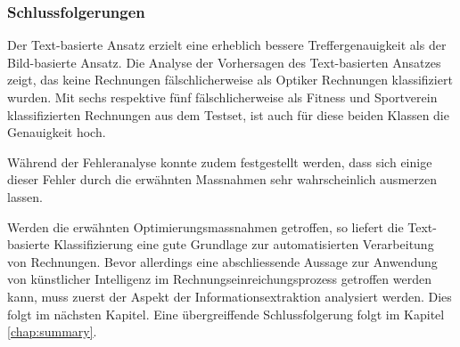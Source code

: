\subsubsection{Schlussfolgerungen}

Der Text-basierte Ansatz erzielt eine erheblich bessere Treffergenauigkeit als der Bild-basierte Ansatz. Die Analyse der Vorhersagen des Text-basierten Ansatzes zeigt, das keine Rechnungen fälschlicherweise als Optiker Rechnungen klassifiziert wurden. Mit sechs respektive fünf fälschlicherweise als Fitness und Sportverein klassifizierten Rechnungen aus dem Testset, ist auch für diese beiden Klassen die Genauigkeit hoch. 


Während der Fehleranalyse konnte zudem festgestellt werden, dass sich einige dieser Fehler durch die erwähnten Massnahmen sehr wahrscheinlich ausmerzen lassen.

Werden die erwähnten Optimierungsmassnahmen getroffen, so liefert die Text-basierte Klassifizierung eine gute Grundlage zur automatisierten Verarbeitung von Rechnungen. Bevor allerdings eine abschliessende Aussage zur Anwendung von künstlicher Intelligenz im Rechnungseinreichungsprozess getroffen werden kann, muss zuerst der Aspekt der Informationsextraktion analysiert werden. Dies folgt im nächsten Kapitel. Eine übergreiffende Schlussfolgerung folgt im Kapitel \ref{chap:summary}.
